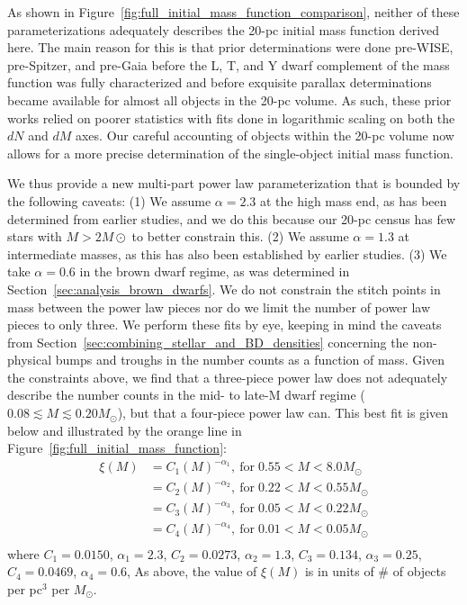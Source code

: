 \documentclass[twocolumn,tighten,twocolappendix]{aastex631}
\begin{document}
As shown in Figure~\ref{fig:full_initial_mass_function_comparison}, neither of these parameterizations adequately describes the 20-pc initial mass function derived here. The main reason for this is that prior determinations were done pre-WISE, pre-Spitzer, and pre-Gaia before the L, T, and Y dwarf complement of the mass function was fully characterized and before exquisite parallax determinations became available for almost all objects in the 20-pc volume. As such, these prior works relied on poorer statistics with fits done in logarithmic scaling on both the $dN$ and $dM$ axes. Our careful accounting of objects within the 20-pc volume now allows for a more precise determination of the single-object initial mass function.

We thus provide a new multi-part power law parameterization that is bounded by the following caveats: (1) We assume $\alpha = 2.3$ at the high mass end, as has been determined from earlier studies, and we do this because our 20-pc census has few stars with $M > 2 M\odot$ to better constrain this. (2) We assume $\alpha = 1.3$ at intermediate masses, as this has also been established by earlier studies. (3) We take $\alpha = 0.6$ in the brown dwarf regime, as was determined in Section~\ref{sec:analysis_brown_dwarfs}. We do not constrain the stitch points in mass between the power law pieces nor do we limit the number of power law pieces to only three. We perform these fits by eye, keeping in mind the caveats from Section~\ref{sec:combining_stellar_and_BD_densities} concerning the non-physical bumps and troughs in the number counts as a function of mass. Given the constraints above, we find that a three-piece power law does not adequately describe the number counts in the mid- to late-M dwarf regime ($0.08 \lesssim M \lesssim 0.20 M_\odot$), but that a four-piece power law can. This best fit is given below and illustrated by the orange line in Figure~\ref{fig:full_initial_mass_function}:
\begin{equation}
\label{eqn:IMF_kirkpatrick}
\begin{split}
   \xi(M) & = C_1  (M)^{-\alpha_1}, \: \textrm{for}\; 0.55 < M < 8.0 M_\odot \\
   & = C_2 (M)^{-\alpha_2}, \: \textrm{for}\; 0.22 < M < 0.55 M_\odot \\
   & = C_3 (M)^{-\alpha_3}, \: \textrm{for}\; 0.05 < M < 0.22 M_\odot \\
   & = C_4 (M)^{-\alpha_4}, \: \textrm{for}\; 0.01 < M < 0.05 M_\odot \\
\end{split}
\end{equation}
where $C_1 = 0.0150$, $\alpha_1 = 2.3$, 
$C_2 = 0.0273$, $\alpha_2 = 1.3$, 
$C_3 = 0.134$, $\alpha_3 = 0.25$, 
$C_4 = 0.0469$, $\alpha_4 = 0.6$, 
As above, the value of $\xi(M)$ is in units of \# of objects per pc$^3$ per $M_\odot$. 
\end{document}
